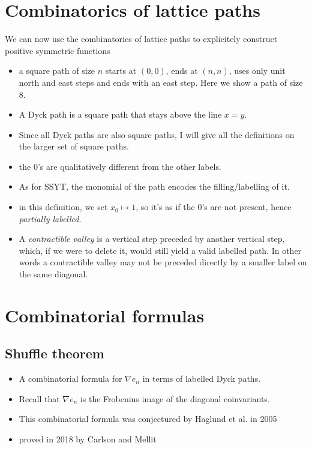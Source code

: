 \documentclass[12pt]{article}
\begin{document}
    \section{Combinatorics of lattice paths}
    
    We can now use the combinatorics of lattice paths to explicitely construct positive symmetric functions
    \begin{itemize}
        \item a square path of size $n$ starts at $(0,0)$, ends at $(n,n)$, uses only unit north and east steps and ends with an east step. Here we show a path of size $8$.
        \item A Dyck path is a square path that stays above the line $x=y$. 
        \item Since all Dyck paths are also square paths, I will give all the definitions on the larger set of square paths.
        \item the $0$'s are qualitatively different from the other labels.
        \item As for SSYT, the monomial of the path encodes the filling/labelling of it.
        \item in this definition, we set $x_0\mapsto 1$, so  it's as if the $0$'s are not present, hence \emph{partially labelled}.
        \item A \emph{contractible valley} is a vertical step preceded by another vertical step, which, if we were to delete it, would still yield a valid labelled path. In other words a contractible valley may not be preceded directly by a smaller label on the same diagonal.
    \end{itemize}

\section{Combinatorial formulas}

\subsection{Shuffle theorem}
    \begin{itemize}
        \item A combinatorial formula for $\nabla e_n$ in terms of labelled Dyck paths.
        \item Recall that $\nabla e_n$ is the Frobenius image of the diagonal coinvariants.
        \item This combinatorial formula was conjectured by Haglund et al. in 2005
        \item proved in 2018 by Carlson and Mellit
    \end{itemize}
\end{document}
